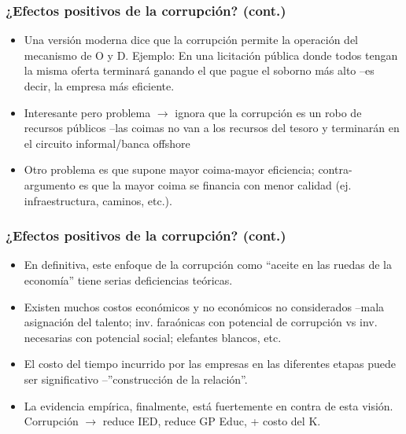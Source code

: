 \documentclass[handout,final,xcolor=dvipsnames]{beamer}
\begin{document}
\begin{frame}\frametitle{¿Efectos positivos de la corrupción? (cont.)}
\begin{itemize}\itemsep 10pt
\item Una versión moderna dice que la corrupción permite
  la operación del mecanismo de O y D. Ejemplo: En una licitación
  pública donde todos tengan la misma oferta terminará ganando el que
  pague el soborno más alto --es decir, la empresa más eficiente. 
\item Interesante pero problema $\longrightarrow$ ignora que la
  corrupción es un robo de recursos públicos --las coimas no van a los
  recursos del tesoro y terminarán en el circuito informal/banca
  offshore
\item Otro problema es que supone mayor coima-mayor eficiencia;
  contra-argumento es que la mayor coima se financia con menor
  calidad (ej. infraestructura, caminos, etc.). 
\end{itemize}
\end{frame}


\begin{frame}\frametitle{¿Efectos positivos de la corrupción? (cont.)}
\begin{itemize}\itemsep 10pt
\item En definitiva, este enfoque de la corrupción como ``aceite en
  las ruedas de la economía'' tiene serias deficiencias teóricas. 
\item Existen muchos costos económicos y no económicos
  no considerados --mala asignación del talento; inv. faraónicas
 con potencial de corrupción vs inv. necesarias con
 potencial social; elefantes blancos, etc. 
\item El costo del tiempo incurrido por las empresas en
  las diferentes etapas puede ser significativo --''construcción de la
  relación''. 
\item La evidencia empírica, finalmente, está fuertemente en contra de
  esta visión. Corrupción $\longrightarrow$ reduce IED, reduce GP
  Educ, + costo del K.  
\end{itemize}
\end{frame}
\end{document}
